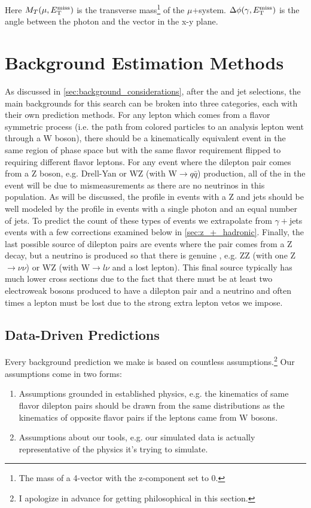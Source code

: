       Here $M_T(\mu, E_{\mathrm{T}}^{\text{miss}})$ is the transverse mass\footnote{The mass of a 4-vector with the z-component set to 0.} of the $\mu$+\MET system. $\Delta \phi(\gamma, E_{\mathrm{T}}^{\text{miss}})$ is the angle between the photon and the \MET vector in the x-y plane. 

\section{Background Estimation Methods} \label{sec:background_estimation_methods}
  
  As discussed in \ref{sec:background_considerations}, after the \Mll and jet selections, the main backgrounds for this search can be broken into three categories, each with their own prediction methods. For any lepton which comes from a flavor symmetric process (i.e. the path from colored particles to an analysis lepton went through a W boson), there should be a kinematically equivalent event in the same region of phase space but with the same flavor requirement flipped to requiring different flavor leptons. For any event where the dilepton pair comes from a Z boson, e.g. Drell-Yan or WZ (with W$\to q\bar{q}$) production, all of the \MET in the event will be due to mismeasurements as there are no neutrinos in this population. As will be discussed, the \MET profile in events with a Z and jets should be well modeled by the \MET profile in events with a single photon and an equal number of jets. To predict the count of these types of events we extrapolate from $\gamma+$jets events with a few corrections examined below in \ref{sec:z_+_hadronic}. Finally, the last possible source of dilepton pairs are events where the pair comes from a Z decay, but a neutrino is produced so that there is genuine \MET, e.g. ZZ (with one Z$\to\nu\nu$) or WZ (with W$\to l \nu$ and a lost lepton). This final source typically has much lower cross sections due to the fact that there must be at least two electroweak bosons produced to have a dilepton pair and a neutrino and often times a lepton must be lost due to the strong extra lepton vetos we impose.

  \subsection{Data-Driven Predictions}
    Every background prediction we make is based on countless assumptions.\footnote{I apologize in advance for getting philosophical in this section.} Our assumptions come in two forms:

    \begin{enumerate}
      \item Assumptions grounded in established physics, e.g. the kinematics of same flavor dilepton pairs should be drawn from the same distributions as the kinematics of opposite flavor pairs if the leptons came from W bosons.

      \item Assumptions about our tools, e.g. our simulated data is actually representative of the physics it's trying to simulate.

    \end{enumerate}

